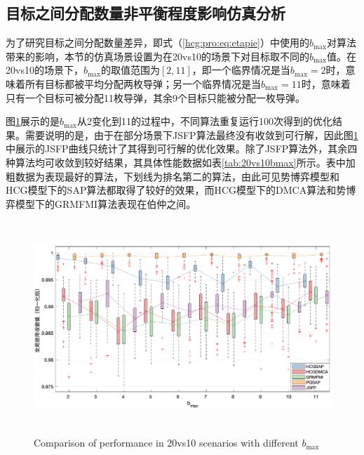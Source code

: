 \subsection{目标之间分配数量非平衡程度影响仿真分析}
\label{hcg:sim:target_num_unbalance}

为了研究目标之间分配数量差异，即式（\ref{hcg:pro:eq:etapie}）中使用的$b_{\text{max}}$对算法带来的影响，本节的仿真场景设置为在20vs10的场景下对目标取不同的$b_{\text{max}}$值。在20vs10的场景下，$b_{\text{max}}$的取值范围为$[2,11]$，即一个临界情况是当$b_{\text{max}}=2$时，意味着所有目标都被平均分配两枚导弹；另一个临界情况是当$b_{\text{max}}=11$时，意味着只有一个目标可被分配11枚导弹，其余9个目标只能被分配一枚导弹。

图\ref{fig:20vs10bmax}展示的是$b_{\text{max}}$从2变化到11的过程中，不同算法重复运行100次得到的优化结果。需要说明的是，由于在部分场景下JSFP算法最终没有收敛到可行解，因此图\ref{fig:20vs10bmax}中展示的JSFP曲线只统计了其得到可行解的优化效果。除了JSFP算法外，其余四种算法均可收敛到较好结果，其具体性能数据如表\ref{tab:20vs10bmax}所示。表中加粗数据为表现最好的算法，下划线为排名第二的算法，由此可见势博弈模型和HCG模型下的SAP算法都取得了较好的效果，而HCG模型下的DMCA算法和势博弈模型下的GRMFMI算法表现在伯仲之间。



\begin{figure}[!htp]
  \centering
  \includegraphics[height=8cm]{hedonic_game/BoxUnbalanceBmaxV2}
    {Comparison of performance in 20vs10 scenarios with different $b_{\text{max}}$}
  \label{fig:20vs10bmax}
\end{figure}

